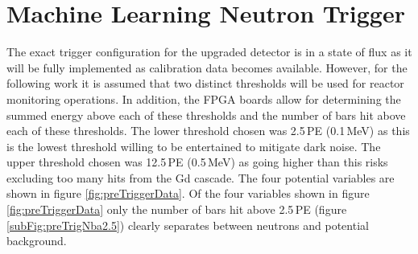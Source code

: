 \clearpage
\section{Machine Learning Neutron Trigger}\label{sec:MachineLearningTrigger}
The exact trigger configuration for the upgraded detector is in a state of flux as it will be fully implemented as calibration data becomes available. However, for the following work it is assumed that two distinct thresholds will be used for reactor monitoring operations. In addition, the FPGA boards allow for determining the summed energy above each of these thresholds and the number of bars hit above each of these thresholds. The lower threshold chosen was 2.5\,PE (0.1\,MeV) as this is the lowest threshold willing to be entertained to mitigate dark noise. The upper threshold chosen was 12.5\,PE (0.5\,MeV) as going higher than this risks excluding too many hits from the Gd cascade. The four potential variables are shown in figure \ref{fig:preTriggerData}. Of the four variables shown in figure \ref{fig:preTriggerData} only the number of bars hit above 2.5\,PE (figure \ref{subFig:preTrigNba2.5}) clearly separates between neutrons and potential background.  
